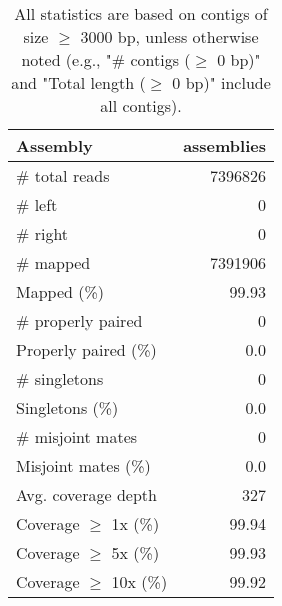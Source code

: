 \documentclass[12pt,a4paper]{article}
\begin{document}
\begin{table}[ht]
\begin{center}
\caption{All statistics are based on contigs of size $\geq$ 3000 bp, unless otherwise noted (e.g., "\# contigs ($\geq$ 0 bp)" and "Total length ($\geq$ 0 bp)" include all contigs).}
\begin{tabular}{|l*{1}{|r}|}
\hline
Assembly & assemblies \\ \hline
\# total reads & 7396826 \\ \hline
\# left & 0 \\ \hline
\# right & 0 \\ \hline
\# mapped & 7391906 \\ \hline
Mapped (\%) & 99.93 \\ \hline
\# properly paired & 0 \\ \hline
Properly paired (\%) & 0.0 \\ \hline
\# singletons & 0 \\ \hline
Singletons (\%) & 0.0 \\ \hline
\# misjoint mates & 0 \\ \hline
Misjoint mates (\%) & 0.0 \\ \hline
Avg. coverage depth & 327 \\ \hline
Coverage $\geq$ 1x (\%) & 99.94 \\ \hline
Coverage $\geq$ 5x (\%) & 99.93 \\ \hline
Coverage $\geq$ 10x (\%) & 99.92 \\ \hline
\end{tabular}
\end{center}
\end{table}
\end{document}
